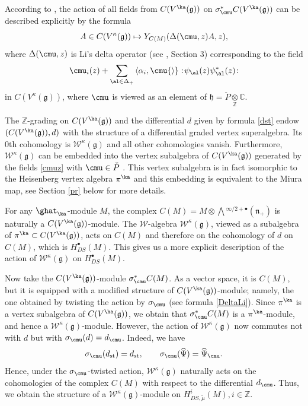 \documentclass{amsart}
\newcommand{\wh}{\widehat}
\newcommand{\bra}{{\langle}}
\newcommand{\ket}{{\rangle}}
\newcommand{\on}{\operatorname}
\newcommand{\+}{\mathop{\oplus}}
\renewcommand{\*}{{\otimes}}
\newcommand{\mf}{\mathfrak}
\newcommand{\g}{\mf{g}}
\newcommand{\h}{\mf{h}}
\newcommand{\Z}{\mathbb{Z}}
\newcommand{\C}{\mathbb{C}}
\newcommand{\W}{\mathscr{W}}
\theoremstyle{theorem}
\theoremstyle{remark}
\numberwithin{equation}{section}
\begin{document}
According to \cite{Li97}, the action of all fields from $C(V^\ka(\g))$
on $\sigma^*_\cmu C(V^\ka(\g))$ can be described explicitly by the
formula
\begin{equation}    \label{DeltaLi}
A \in C(V^\kappa(\g)) \mapsto Y_{C(M)}(\Delta(\cmu,z)A,z),
\end{equation}
where $\Delta(\cmu,z)$ is Li's delta operator (see \cite{Li97},
Section 3) corresponding to the field
\begin{equation}    \label{cmuz}
\cmu_i(z) + \sum_{\al \in \Delta_+} \bra \alpha_i,\cmu \ket :\! \psi_\al(z)
\psi^*_\al(z) \! :
\end{equation}
in $C(V^\kappa(\g))$, where $\cmu$ is viewed as an element of $\h =
\check{P} \underset{\Z}\otimes \C$.

The $\Z$-grading on $C(V^\ka(\g))$ and the differential $d$ given by
formula \eqref{dst} endow $(C(V^\ka(\g)),d)$ with the structure of a
differential graded vertex superalgebra. Its $0$th cohomology is
$\W^\kappa(\g)$ and all other cohomologies vanish. Furthermore,
$\W^\kappa(\g)$ can be embedded into the vertex subalgebra of
$C(V^\ka(\g))$ generated by the fields \eqref{cmuz} with $\cmu \in
\check{P}$ \cite{FF,FreBen04}. This vertex subalgebra is in fact
isomorphic to the Heisenberg vertex algebra $\pi^\ka$ and this
embedding is equivalent to the Miura map, see Section
\ref{pr} below for more details.

For any $\ghat_\ka$-module $M$, the complex $C(M) = M \otimes
\bigwedge{}^{\infty/2+\bullet}(\mf{n}_+)$ is naturally a
$C(V^\ka(\g))$-module. The $\W$-algebra $\W^\kappa(\g)$, viewed as a
subalgebra of $\pi^\ka \subset C(V^\ka(\g))$, acts on $C(M)$ and
therefore on the cohomology of $d$ on $C(M)$, which is
$H^\bullet_{DS}(M)$. This gives us a more explicit description of the
action of $\W^\kappa(\g)$ on $H^\bullet_{DS}(M)$.

Now take the $C(V^\ka(\g))$-module $\sigma^*_\cmu C(M)$. As a vector
space, it is $C(M)$, but it is equipped with a modified structure of
$C(V^\ka(\g))$-module; namely, the one obtained by twisting the action
by $\sigma_\cmu$ (see formula \eqref{DeltaLi}). Since $\pi^\ka$ is a
vertex subalgebra of $C(V^\ka(\g))$, we obtain that $\sigma^*_\cmu
C(M)$ is a $\pi^\ka$-module, and hence a $\W^\kappa(\g)$-module.
However, the action of $\W^\kappa(\g)$ now commutes not with $d$ but
with $\sigma_\cmu(d) = d_\cmu$. Indeed, we have
$$
\sigma_\cmu(d_{\on{st}}) = d_{\on{st}}, \qquad \sigma_\cmu(\wh\Psi) =
\wh\Psi_\cmu.
$$
Hence, under the $\sigma_\cmu$-twisted action, $\W^\kappa(\g)$
naturally acts on the cohomologies of the complex $C(M)$ with respect
to the differential $d_\cmu$. Thus, we obtain the structure of a
$\W^\kappa(\g)$-module on $H_{DS,\check{\mu}}^i(M), i \in \Z$.
\end{document}
